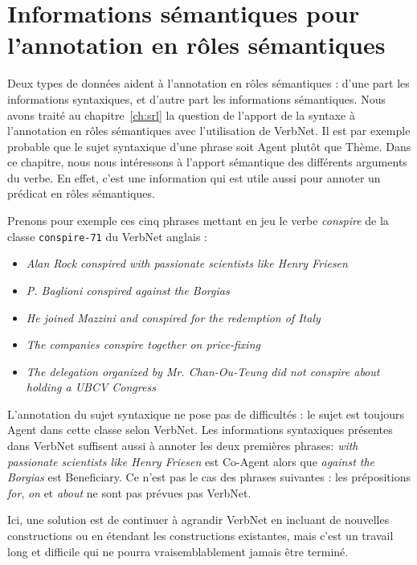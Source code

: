 \chapter{Informations sémantiques pour l'annotation en rôles sémantiques}
\label{ch:semantic}

Deux types de données aident à l'annotation en rôles sémantiques : d'une part
les informations syntaxiques, et d'autre part les informations sémantiques.
Nous avons traité au chapitre~\ref{ch:srl} la question de l'apport de la
syntaxe à l'annotation en rôles sémantiques avec l'utilisation de VerbNet. Il
est par exemple probable que le sujet syntaxique d'une phrase soit Agent plutôt
que Thème.  Dans ce chapitre, nous nous intéressons à l'apport sémantique des
différents arguments du verbe. En effet, c'est une information qui est utile
aussi pour annoter un prédicat en rôles sémantiques.

Prenons pour exemple ces cinq phrases mettant en jeu le verbe
\emph{conspire} de la classe \texttt{conspire-71} du VerbNet anglais :

\begin{itemize}
    \item \emph{Alan Rock conspired with passionate scientists like Henry Friesen}
    \item \emph{P. Baglioni conspired against the Borgias}
    \item \emph{He joined Mazzini and conspired for the redemption of Italy}
    \item \emph{The companies conspire together on price-fixing}
    \item \emph{The delegation organized by Mr. Chan-Ou-Teung did not conspire about holding a UBCV Congress}
\end{itemize}

L'annotation du sujet syntaxique ne pose pas de difficultés : le sujet est
toujours Agent dans cette classe selon VerbNet. Les informations syntaxiques
présentes dans VerbNet suffisent aussi à annoter les deux premières phrases:
\emph{with passionate scientists like Henry Friesen} est Co-Agent alors que
\emph{against the Borgias} est Beneficiary. Ce n'est pas le cas des phrases
suivantes : les prépositions \emph{for}, \emph{on} et \emph{about} ne sont pas
prévues pas VerbNet.

Ici, une solution est de continuer à agrandir VerbNet en incluant de nouvelles
constructions ou en étendant les constructions existantes, mais c'est un
travail long et difficile qui ne pourra vraisemblablement jamais être terminé.

